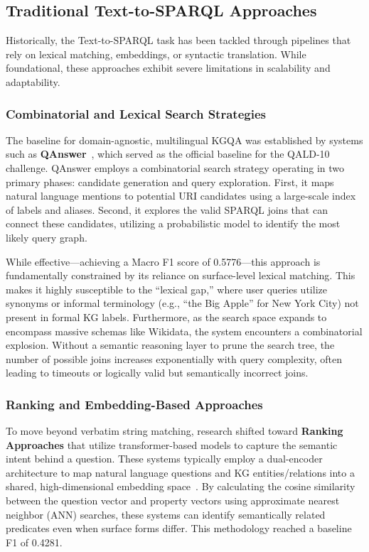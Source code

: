 \subsection{Traditional Text-to-SPARQL Approaches}
Historically, the Text-to-SPARQL task has been tackled through pipelines that rely on lexical matching, embeddings, or syntactic translation. While foundational, these approaches exhibit severe limitations in scalability and adaptability.

\subsubsection{Combinatorial and Lexical Search Strategies}
The baseline for domain-agnostic, multilingual KGQA was established by systems such as \textbf{QAnswer}~\cite{diefenbach2019qanswer}, which served as the official baseline for the QALD-10 challenge. QAnswer employs a combinatorial search strategy operating in two primary phases: candidate generation and query exploration. First, it maps natural language mentions to potential URI candidates using a large-scale index of labels and aliases. Second, it explores the valid SPARQL joins that can connect these candidates, utilizing a probabilistic model to identify the most likely query graph.

While effective—achieving a Macro F1 score of 0.5776—this approach is fundamentally constrained by its reliance on surface-level lexical matching. This makes it highly susceptible to the ``lexical gap,'' where user queries utilize synonyms or informal terminology (e.g., ``the Big Apple'' for New York City) not present in formal KG labels. Furthermore, as the search space expands to encompass massive schemas like Wikidata, the system encounters a combinatorial explosion. Without a semantic reasoning layer to prune the search tree, the number of possible joins increases exponentially with query complexity, often leading to timeouts or logically valid but semantically incorrect joins.

\subsubsection{Ranking and Embedding-Based Approaches}
To move beyond verbatim string matching, research shifted toward \textbf{Ranking Approaches} that utilize transformer-based models to capture the semantic intent behind a question. These systems typically employ a dual-encoder architecture to map natural language questions and KG entities/relations into a shared, high-dimensional embedding space~\cite{baramiia2022ranking}. By calculating the cosine similarity between the question vector and property vectors using approximate nearest neighbor (ANN) searches, these systems can identify semantically related predicates even when surface forms differ. This methodology reached a baseline F1 of 0.4281.

